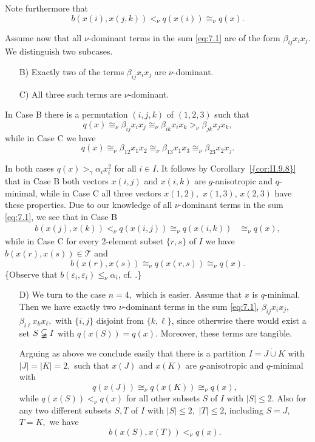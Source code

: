 \documentclass [12pt,a4paper,reqno]{amsart}
\begin{document}
Note furthermore that
$$b(x(i),x(j,k))<_\nu q(x(i)) \cong_\nu q(x).$$

Assume now that all $\nu$-dominant terms in the sum \eqref{eq:7.1}
are of the form ${\beta}_{ij}x_ix_j.$ We distinguish two subcases.
\begin{enumerate} {\setlength{\itemsep}{2pt}}
\item[B)] Exactly two of the terms ${\beta}_{ij}x_ix_j$ are
$\nu$-dominant. \item[C)] All three such terms are $\nu$-dominant.
\end{enumerate}

In Case B there is a permutation $(i,j,k)$ of $(1,2,3)$ such that
\begin{equation}\label{eq:7.2}
q(x)\cong_\nu{\beta}_{ij}x_ix_j\cong_\nu{\beta}_{ik}x_ix_k>_\nu{\beta}_{jk}x_jx_k,
\end{equation}
while in Case C we have
\begin{equation}\label{eq:7.3}
q(x)\cong_\nu{\beta}_{12}x_1x_2\cong_\nu{\beta}_{13}x_1x_3 \cong_\nu{\beta}_{23}x_2x_j.
\end{equation}

In both cases $q(x)>_\gamma {\alpha}_ix_i^2$ for all $i\in I.$ It
follows by {Corollary~\ref{{cor:II.9.8}}} that in Case B both vectors $x(i,j)$
and $x(i,k)$ are $g$-anisotropic and $q$-minimal, while in Case C
all three vectors $x(1,2),$ $x(1,3)$, $x(2,3)$ have these
properties. Due to our knowledge of all $\nu$-dominant terms in
the sum \eqref{eq:7.1}, we see that in Case B
\begin{align*}
b(x(j),x(k))<_\nu q(x(i,j))\cong_\nu q(x(i,k))
&\cong_\nu q(x), \end{align*} while in Case C for every 2-element
subset $\{r,s\}$ of $I$ we have $b(x(r),x(s))\in {\mathcal T} $ and
$$b (x(r),x(s))\cong_\nu q(x(r,s))\cong_\nu q(x).$$
\{Observe that $b({\varepsilon}_i,{\varepsilon}_i)\le_\nu{\alpha}_i$,
cf. \cite[Ineq. (1.9)]{QF1}.\}

\begin{enumerate}
\item[D)] We turn to the case $n=4,$ which is easier. Assume that
$x$ is $q$-minimal. Then we have exactly two $\nu$-dominant terms
in the sum \eqref{eq:7.1}, ${\beta}_{ij}x_ix_j,$
${\beta}_{i\ell}x_kx_\ell,$ with $\{i,j\}$ disjoint from
$\{k,\ell\}$, since otherwise there would exist a set
$S\varsubsetneqq I$ with $q(x(S))=q(x).$ Moreover, these terms are
tangible.

Arguing as above we conclude easily that there is a partition
$I=J\dot\cup K$ with $|J|=|K|=2,$ such that $x(J)$ and $x(K)$ are
$g$-anisotropic and $q$-minimal with
$$q(x(J))\cong_\nu q(x(K))\cong_\nu q(x),$$
while $q(x(S))<_\nu q(x)$ for all other subsets $S$ of $I$ with
$|S|\le 2.$ Also for any two different subsets $S,T$ of $I$ with
$|S|\le 2, $ $|T|\le 2$, including $S=J,$ $T=K,$ we have
$$b(x(S),x(T))<_\nu q(x).$$
\end{enumerate}
\end{document}
